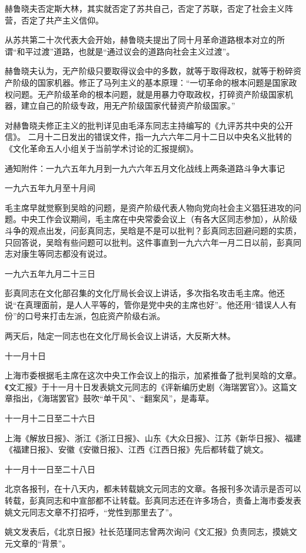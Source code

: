 \begin{maonote}
赫鲁晓夫否定斯大林，其实就否定了苏共自己，否定了苏联，否定了社会主义阵营，否定了共产主义信仰。

从苏共第二十次代表大会开始，赫鲁晓夫提出了同十月革命道路根本对立的所谓“和平过渡”道路，也就是“通过议会的道路向社会主义过渡”。

赫鲁晓夫认为，无产阶级只要取得议会中的多数，就等于取得政权，就等于粉碎资产阶级的国家机器。修正了马列主义的基本原理：“一切革命的根本问题是国家政权问题。无产阶级革命的根本问题，就是用暴力夺取政权，打碎资产阶级国家机器，建立自己的阶级专政，用无产阶级国家代替资产阶级国家。”

对赫鲁晓夫修正主义的批判详见由毛泽东同志主持编写的《九评苏共中央的公开信》。
二月十二日发出的错误文件，指一九六六年二月十二日以中央名义批转的《文化革命五人小组关于当前学术讨论的汇报提纲》。

通知附件：一九六五年九月到一九六六年五月文化战线上两条道路斗争大事记

一九六五年九月至十月间

毛主席早就觉察到吴晗的问题，是资产阶级代表人物向党向社会主义猖狂进攻的问题。中央工作会议期间，毛主席在中央常委会议上（有各大区同志参加），从阶级斗争的观点出发，问彭真同志，吴晗是不是可以批判？彭真同志回避问题的实质，只回答说，吴晗有些问题可以批判。这件事直到一九六六年一月二日以前，彭真同志对康生等同志都没有说过。

一九六五年九月二十三日

彭真同志在文化部召集的文化厅局长会议上讲话，多次指名攻击毛主席。他还说“在真理面前，是人人平等的，管你是党中央的主席也好”。他还用“错误人人有份”的口号来打击左派，包庇资产阶级右派。

两天后，陆定一同志也在文化厅局长会议上讲话，大反斯大林。

十一月十日

上海市委根据毛主席在这次中央工作会议上的指示，加紧推备了批判吴晗的文章。《文汇报》于十一月十日发表姚文元同志的《评新编历史剧〈海瑞罢官〉》。这篇文章指出，《海瑞罢官》鼓吹“单干风”、“翻案风”，是毒草。

十一月十二日至二十六日

上海《解放日报》、浙江《浙江日报》、山东《大众日报》、江苏《新华日报》、福建《福建日报》、安徽《安徽日报》、江西《江西日报》先后都转载了姚文。

十一月十一日至二十八日

北京各报刊，在十八天内，都未转载姚文元同志的文章。各报刊多次请示是否可以转载，彭真同志和中宣部都不让转载。彭真同志还在许多场合，责备上海市委发表姚文元同志文章不打招呼，“党性到那里去了”。

姚文发表后，《北京日报》社长范瑾同志曾两次询问《文汇报》负责同志，摸姚文元文章的“背景”。


\end{maonote}

